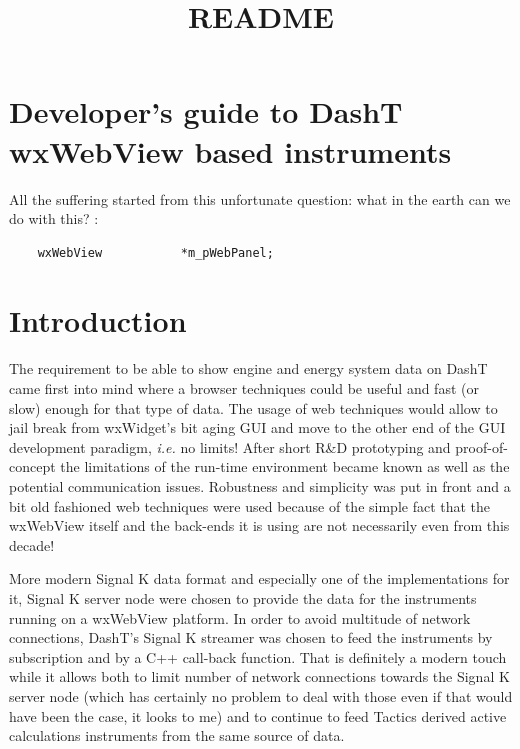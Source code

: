 \documentclass[11pt]{article}
\title{README}
\begin{document}
    
    \maketitle
    
    

    
    \hypertarget{developers-guide-to-dasht-wxwebview-based-instruments}{%
\section{Developer's guide to DashT wxWebView based
instruments}\label{developers-guide-to-dasht-wxwebview-based-instruments}}

    All the suffering started from this unfortunate question: what in the
earth can we do with this? :

\begin{verbatim}
    wxWebView           *m_pWebPanel;
\end{verbatim}

    \hypertarget{introduction}{%
\section{Introduction}\label{introduction}}

    The requirement to be able to show engine and energy system data on
DashT came first into mind where a browser techniques could be useful
and fast (or slow) enough for that type of data. The usage of web
techniques would allow to jail break from wxWidget's bit aging GUI and
move to the other end of the GUI development paradigm, \emph{i.e.} no
limits! After short R\&D prototyping and proof-of-concept the
limitations of the run-time environment became known as well as the
potential communication issues. Robustness and simplicity was put in
front and a bit old fashioned web techniques were used because of the
simple fact that the wxWebView itself and the back-ends it is using are
not necessarily even from this decade!

    More modern Signal K data format and especially one of the
implementations for it, Signal K server node were chosen to provide the
data for the instruments running on a wxWebView platform. In order to
avoid multitude of network connections, DashT's Signal K streamer was
chosen to feed the instruments by subscription and by a C++ call-back
function. That is definitely a modern touch while it allows both to
limit number of network connections towards the Signal K server node
(which has certainly no problem to deal with those even if that would
have been the case, it looks to me) and to continue to feed Tactics
derived active calculations instruments from the same source of data.
\end{document}
